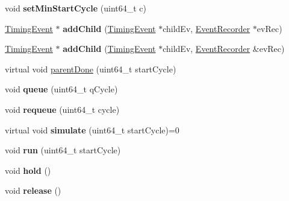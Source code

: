 \begin{DoxyCompactItemize}
\item 
\hypertarget{classTimingEvent_add6357681c04aed9525ceac030716db1}{void {\bfseries set\-Min\-Start\-Cycle} (uint64\-\_\-t c)}\label{classTimingEvent_add6357681c04aed9525ceac030716db1}

\item 
\hypertarget{classTimingEvent_a06d4af1893169b4d7b565259d7cfa38b}{\hyperlink{classTimingEvent}{Timing\-Event} $\ast$ {\bfseries add\-Child} (\hyperlink{classTimingEvent}{Timing\-Event} $\ast$child\-Ev, \hyperlink{classEventRecorder}{Event\-Recorder} $\ast$ev\-Rec)}\label{classTimingEvent_a06d4af1893169b4d7b565259d7cfa38b}

\item 
\hypertarget{classTimingEvent_a623c3ec34368c4ad014894e54f1761fb}{\hyperlink{classTimingEvent}{Timing\-Event} $\ast$ {\bfseries add\-Child} (\hyperlink{classTimingEvent}{Timing\-Event} $\ast$child\-Ev, \hyperlink{classEventRecorder}{Event\-Recorder} \&ev\-Rec)}\label{classTimingEvent_a623c3ec34368c4ad014894e54f1761fb}

\item 
virtual void \hyperlink{classTimingEvent_a55e7e2942d6607eb2a9dd484baf39070}{parent\-Done} (uint64\-\_\-t start\-Cycle)
\item 
\hypertarget{classTimingEvent_a1eaa3f3f350fb09b9549c4be1dab5091}{void {\bfseries queue} (uint64\-\_\-t q\-Cycle)}\label{classTimingEvent_a1eaa3f3f350fb09b9549c4be1dab5091}

\item 
\hypertarget{classTimingEvent_a1f737188e07a4f444115f95bf3c1ef7e}{void {\bfseries requeue} (uint64\-\_\-t cycle)}\label{classTimingEvent_a1f737188e07a4f444115f95bf3c1ef7e}

\item 
\hypertarget{classTimingEvent_a99608e7c0c6bbc199fd7ab3cc6707dea}{virtual void {\bfseries simulate} (uint64\-\_\-t start\-Cycle)=0}\label{classTimingEvent_a99608e7c0c6bbc199fd7ab3cc6707dea}

\item 
\hypertarget{classTimingEvent_a78fe421d9a91c70ec249630e3aab8780}{void {\bfseries run} (uint64\-\_\-t start\-Cycle)}\label{classTimingEvent_a78fe421d9a91c70ec249630e3aab8780}

\item 
\hypertarget{classTimingEvent_aa042bb6b4c70456fd81544da49583bbb}{void {\bfseries hold} ()}\label{classTimingEvent_aa042bb6b4c70456fd81544da49583bbb}

\item 
\hypertarget{classTimingEvent_adbbe5607f59f4278462738064fd839f6}{void {\bfseries release} ()}\label{classTimingEvent_adbbe5607f59f4278462738064fd839f6}


\end{DoxyCompactItemize}
